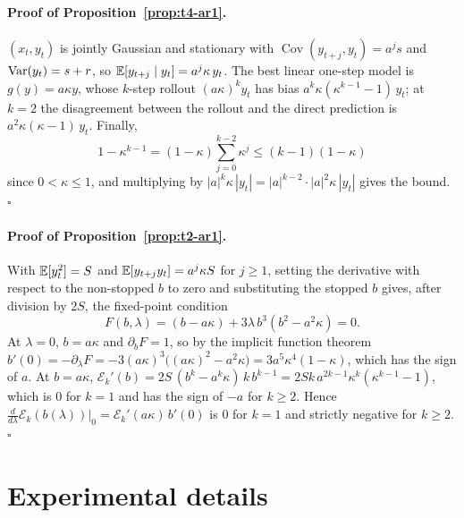 \paragraph{Proof of Proposition~\ref{prop:t4-ar1}.}
$(x_t, y_t)$ is jointly Gaussian and stationary with $\operatorname{Cov}(y_{t+j}, y_t) = a^{j} s$ and $\operatorname{Var}(y_t) = s + r$, so $\mathbb{E}[y_{t+j} \mid y_t] = a^{j} \kappa\, y_t$. The best linear one-step model is $g(y) = a\kappa y$, whose $k$-step rollout $(a\kappa)^{k} y_t$ has bias $a^{k}\kappa(\kappa^{k-1} - 1)\, y_t$; at $k = 2$ the disagreement between the rollout and the direct prediction is $a^{2}\kappa(\kappa - 1)\, y_t$. Finally,
\[
  1 - \kappa^{k-1} = (1 - \kappa) \sum_{j=0}^{k-2} \kappa^{j} \le (k-1)(1 - \kappa)
\]
since $0 < \kappa \le 1$, and multiplying by $|a|^{k}\kappa\,|y_t| = |a|^{k-2} \cdot |a|^{2}\kappa\,|y_t|$ gives the bound. \hfill$\square$

\paragraph{Proof of Proposition~\ref{prop:t2-ar1}.}
With $\mathbb{E}[y_t^2] = S$ and $\mathbb{E}[y_{t+j} y_t] = a^{j}\kappa S$ for $j \ge 1$, setting the derivative with respect to the non-stopped $b$ to zero and substituting the stopped $b$ gives, after division by $2S$, the fixed-point condition
\[
  F(b, \lambda) = (b - a\kappa) + 3\lambda\, b^{3} (b^{2} - a^{2}\kappa) = 0 .
\]
At $\lambda = 0$, $b = a\kappa$ and $\partial_b F = 1$, so by the implicit function theorem $b'(0) = -\partial_\lambda F = -3 (a\kappa)^{3}\big((a\kappa)^{2} - a^{2}\kappa\big) = 3 a^{5}\kappa^{4}(1 - \kappa)$, which has the sign of $a$. At $b = a\kappa$, $\mathcal E_k'(b) = 2S\,(b^{k} - a^{k}\kappa)\, k\, b^{k-1} = 2Sk\, a^{2k-1}\kappa^{k}(\kappa^{k-1} - 1)$, which is $0$ for $k = 1$ and has the sign of $-a$ for $k \ge 2$. Hence $\frac{d}{d\lambda}\mathcal E_k(b(\lambda))|_{0} = \mathcal E_k'(a\kappa)\, b'(0)$ is $0$ for $k = 1$ and strictly negative for $k \ge 2$. \hfill$\square$

\section{Experimental details}
\label{app:details}


